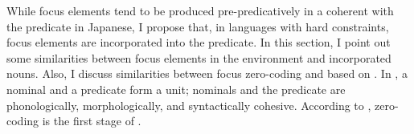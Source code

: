 While focus elements tend to be produced pre-predicatively in a coherent  with the predicate in Japanese,
I propose that, in languages with hard constraints,
focus elements are incorporated into the predicate.
In this section,
I point out some similarities between focus elements in the  environment and incorporated nouns.
Also, I discuss similarities between focus zero-coding and  based on .
In ,
a nominal and a predicate form a unit;
nominals and the predicate are phonologically, morphologically, and syntactically {cohesive}.
According to ,
zero-coding is the first stage of .

